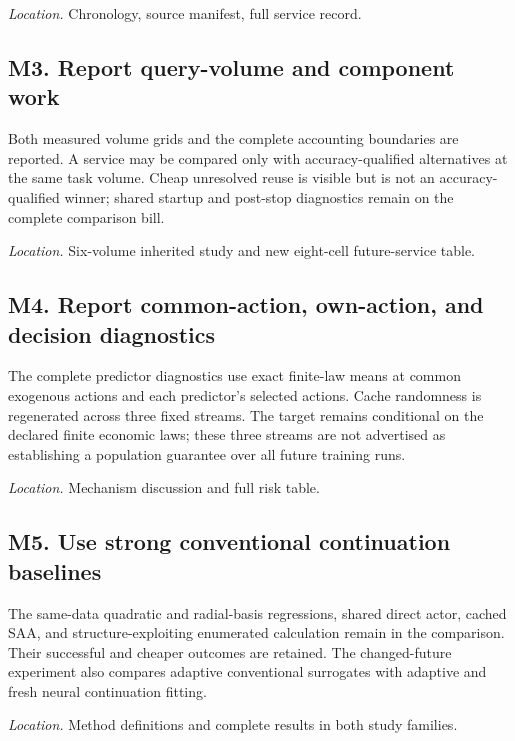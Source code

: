 \documentclass[ecta,nameyear,draft]{econsocart}
\theoremstyle{definition}
\theoremstyle{remark}
\begin{document}
\par\smallskip\noindent\emph{Location.} Chronology, source manifest, full service record.

\subsection*{M3. Report query-volume and component work}

Both measured volume grids and the complete accounting boundaries are reported. A service may be compared only with accuracy-qualified alternatives at the same task volume. Cheap unresolved reuse is visible but is not an accuracy-qualified winner; shared startup and post-stop diagnostics remain on the complete comparison bill.


\par\smallskip\noindent\emph{Location.} Six-volume inherited study and new eight-cell future-service table.

\subsection*{M4. Report common-action, own-action, and decision diagnostics}

The complete predictor diagnostics use exact finite-law means at common exogenous actions and each predictor's selected actions. Cache randomness is regenerated across three fixed streams. The target remains conditional on the declared finite economic laws; these three streams are not advertised as establishing a population guarantee over all future training runs.


\par\smallskip\noindent\emph{Location.} Mechanism discussion and full risk table.

\subsection*{M5. Use strong conventional continuation baselines}

The same-data quadratic and radial-basis regressions, shared direct actor, cached SAA, and structure-exploiting enumerated calculation remain in the comparison. Their successful and cheaper outcomes are retained. The changed-future experiment also compares adaptive conventional surrogates with adaptive and fresh neural continuation fitting.


\par\smallskip\noindent\emph{Location.} Method definitions and complete results in both study families.
\end{document}
